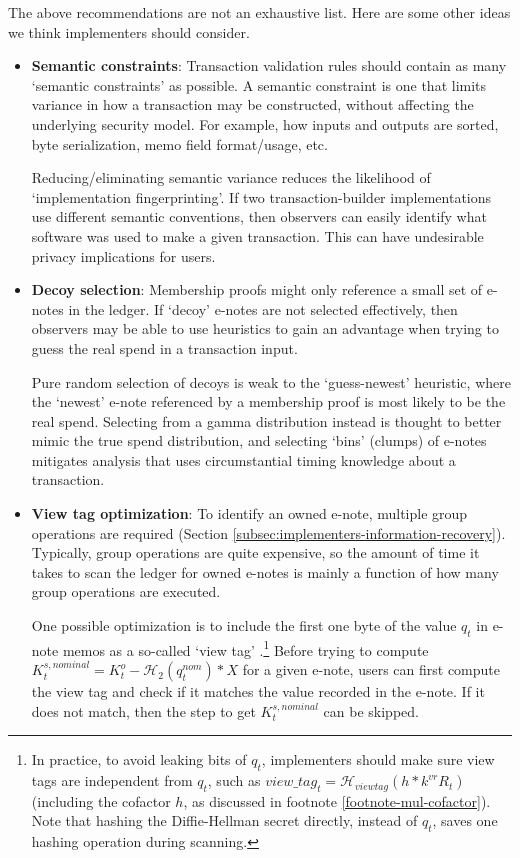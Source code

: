 The above recommendations are not an exhaustive list. Here are some other ideas we think implementers should consider.

\begin{itemize}
    \item \textbf{Semantic constraints}: Transaction validation rules should contain as many `semantic constraints' as possible. A semantic constraint is one that limits variance in how a transaction may be constructed, without affecting the underlying security model. For example, how inputs and outputs are sorted, byte serialization, memo field format/usage, etc.

    Reducing/eliminating semantic variance reduces the likelihood of `implementation fingerprinting'. If two transaction-builder implementations use different semantic conventions, then observers can easily identify what software was used to make a given transaction. This can have undesirable privacy implications for users.

    \item \textbf{Decoy selection}: Membership proofs might only reference a small set of e-notes in the ledger. If `decoy' e-notes are not selected effectively, then observers may be able to use heuristics to gain an advantage when trying to guess the real spend in a transaction input.

    Pure random selection of decoys is weak to the `guess-newest' heuristic, where the `newest' e-note referenced by a membership proof is most likely to be the real spend. Selecting from a gamma distribution instead is thought to better mimic the true spend distribution, and selecting `bins' (clumps) of e-notes mitigates analysis that uses circumstantial timing knowledge about a transaction. \cite{AnalysisOfLinkability, foundations-ring-sampling}

    \item \textbf{View tag optimization}: To identify an owned e-note, multiple group operations are required (Section \ref{subsec:implementers-information-recovery}). Typically, group operations are quite expensive, so the amount of time it takes to scan the ledger for owned e-notes is mainly a function of how many group operations are executed.

    One possible optimization is to include the first one byte of the value $q_t$ in e-note memos as a so-called `view tag' \cite{reduce-scan-times-view-tag-research-issue-73}.\footnote{In practice, to avoid leaking bits of $q_t$, implementers should make sure view tags are independent from $q_t$, such as $view\_tag_t = \mathcal{H}_{viewtag}(h * k^{vr} R_t)$ (including the cofactor $h$, as discussed in footnote \ref{footnote-mul-cofactor}). Note that hashing the Diffie-Hellman secret directly, instead of $q_t$, saves one hashing operation during scanning.} Before trying to compute $K^{s,nominal}_t = K^o_t - \mathcal{H}_2(q^{nom}_t)*X$ for a given e-note, users can first compute the view tag and check if it matches the value recorded in the e-note. If it does not match, then the step to get $K^{s,nominal}_t$ can be skipped.
\end{itemize}



